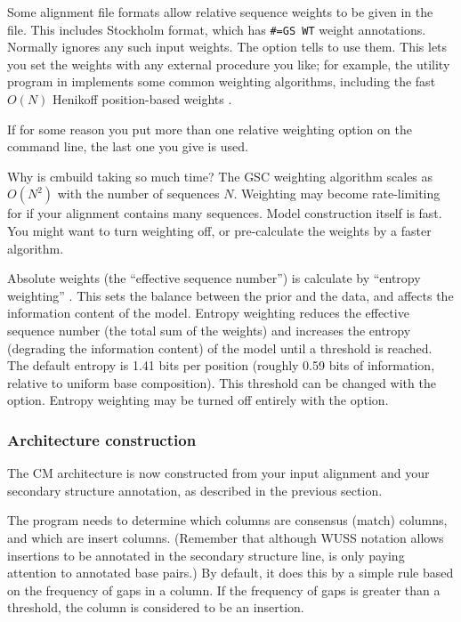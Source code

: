 Some alignment file formats allow relative sequence weights to be
given in the file. This includes Stockholm format, which has
\verb+#=GS WT+ weight annotations. Normally  ignores any
such input weights.  The  option tells 
to use them.  This lets you set the weights with any external
procedure you like; for example, the  utility program in
 implements some common weighting algorithms,
including the fast $O(N)$ Henikoff position-based weights
\cite{Henikoff94b}.

If for some reason you put more than one relative weighting option on
the command line, the last one you give is used.

\begin{srefaq}{Why is cmbuild taking so much time?} The GSC weighting algorithm
scales as $O(N^2)$ with the number of sequences $N$. Weighting may
become rate-limiting for  if your alignment contains
many sequences. Model construction itself is fast. You might want to
turn weighting off, or pre-calculate the weights by a faster
algorithm.
\end{srefaq}

Absolute weights (the ``effective sequence number'') is calculate by
``entropy weighting'' \cite{Karplus98}. This sets the balance between
the prior and the data, and affects the information content of the
model. Entropy weighting reduces the effective sequence number (the
total sum of the weights) and increases the entropy (degrading the
information content) of the model until a threshold is reached. The
default entropy is 1.41 bits per position (roughly 0.59 bits of
information, relative to uniform base composition). This threshold can
be changed with the  option. Entropy weighting may
be turned off entirely with the  option.


\subsubsection{Architecture construction}

The CM architecture is now constructed from your input alignment and
your secondary structure annotation, as described in the previous
section. 

The program needs to determine which columns are consensus (match)
columns, and which are insert columns. (Remember that although WUSS
notation allows insertions to be annotated in the secondary structure
line,  is only paying attention to annotated base
pairs.) By default, it does this by a simple rule based on the
frequency of gaps in a column. If the frequency of gaps is greater
than a threshold, the column is considered to be an insertion. 

